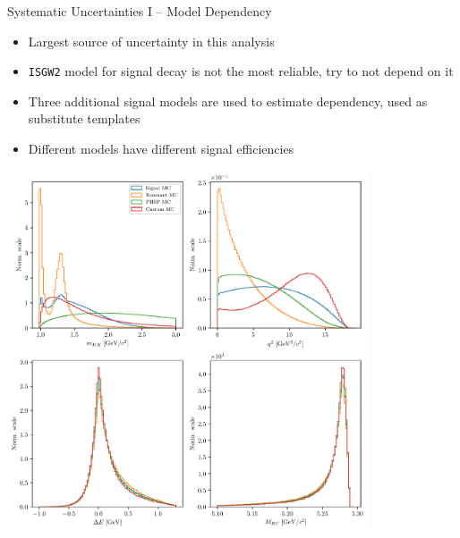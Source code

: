 \documentclass[serif]{beamer}
\begin{document}
\begin{frame}[t]{Systematic Uncertainties I -- Model Dependency}

\vspace{-3mm}
\small

\begin{itemize}
	\item Largest source of uncertainty in this analysis
	\item \texttt{ISGW2} model for signal decay is not the most reliable, try to not depend on it
	\item Three additional signal models are used to estimate dependency, used as substitute templates
	\item Different models have different signal efficiencies
\end{itemize}
\vspace{-2mm}

	\begin{center}
		\includegraphics[width=0.8\textwidth, trim={0 10cm 0 0},clip]{fig/model_cases}
	\end{center}	


\end{frame}

\end{document}
